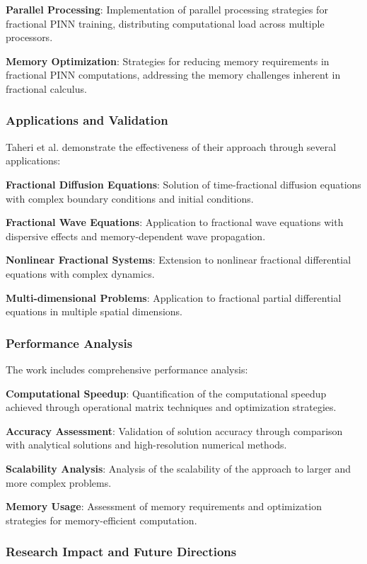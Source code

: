 \textbf{Parallel Processing}: Implementation of parallel processing strategies for fractional PINN training, distributing computational load across multiple processors.

\textbf{Memory Optimization}: Strategies for reducing memory requirements in fractional PINN computations, addressing the memory challenges inherent in fractional calculus.

\subsubsection{Applications and Validation}

Taheri et al. demonstrate the effectiveness of their approach through several applications:

\textbf{Fractional Diffusion Equations}: Solution of time-fractional diffusion equations with complex boundary conditions and initial conditions.

\textbf{Fractional Wave Equations}: Application to fractional wave equations with dispersive effects and memory-dependent wave propagation.

\textbf{Nonlinear Fractional Systems}: Extension to nonlinear fractional differential equations with complex dynamics.

\textbf{Multi-dimensional Problems}: Application to fractional partial differential equations in multiple spatial dimensions.

\subsubsection{Performance Analysis}

The work includes comprehensive performance analysis:

\textbf{Computational Speedup}: Quantification of the computational speedup achieved through operational matrix techniques and optimization strategies.

\textbf{Accuracy Assessment}: Validation of solution accuracy through comparison with analytical solutions and high-resolution numerical methods.

\textbf{Scalability Analysis}: Analysis of the scalability of the approach to larger and more complex problems.

\textbf{Memory Usage}: Assessment of memory requirements and optimization strategies for memory-efficient computation.

\subsubsection{Research Impact and Future Directions}

